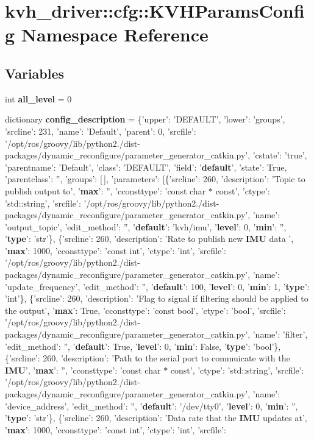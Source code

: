 \section{kvh\-\_\-driver\-:\-:cfg\-:\-:\-K\-V\-H\-Params\-Config \-Namespace \-Reference}
\label{namespacekvh__driver_1_1cfg_1_1KVHParamsConfig}
\subsection*{\-Variables}
\begin{DoxyCompactItemize}
\item 
int {\bf all\-\_\-level} = 0
\item 
dictionary {\bf config\-\_\-description} = \{'upper'\-: '\-D\-E\-F\-A\-U\-L\-T', 'lower'\-: 'groups', 'srcline'\-: 231, 'name'\-: '\-Default', 'parent'\-: 0, 'srcfile'\-: '/opt/ros/groovy/lib/python2./dist-\/packages/dynamic\-\_\-reconfigure/parameter\-\_\-generator\-\_\-catkin.\-py', 'cstate'\-: 'true', 'parentname'\-: '\-Default', 'class'\-: '\-D\-E\-F\-A\-U\-L\-T', 'field'\-: '{\bf default}', 'state'\-: \-True, 'parentclass'\-: '', 'groups'\-: [$\,$], 'parameters'\-: [\{'srcline'\-: 260, 'description'\-: '\-Topic to publish output to', '{\bf max}'\-: '', 'cconsttype'\-: 'const char $\ast$ const', 'ctype'\-: 'std\-::string', 'srcfile'\-: '/opt/ros/groovy/lib/python2./dist-\/packages/dynamic\-\_\-reconfigure/parameter\-\_\-generator\-\_\-catkin.\-py', 'name'\-: 'output\-\_\-topic', 'edit\-\_\-method'\-: '', '{\bf default}'\-: 'kvh/imu', '{\bf level}'\-: 0, '{\bf min}'\-: '', '{\bf type}'\-: 'str'\}, \{'srcline'\-: 260, 'description'\-: '\-Rate to publish new {\bf \-I\-M\-U} data ', '{\bf max}'\-: 1000, 'cconsttype'\-: 'const int', 'ctype'\-: 'int', 'srcfile'\-: '/opt/ros/groovy/lib/python2./dist-\/packages/dynamic\-\_\-reconfigure/parameter\-\_\-generator\-\_\-catkin.\-py', 'name'\-: 'update\-\_\-frequency', 'edit\-\_\-method'\-: '', '{\bf default}'\-: 100, '{\bf level}'\-: 0, '{\bf min}'\-: 1, '{\bf type}'\-: 'int'\}, \{'srcline'\-: 260, 'description'\-: '\-Flag to signal if filtering should be applied to the output', '{\bf max}'\-: \-True, 'cconsttype'\-: 'const bool', 'ctype'\-: 'bool', 'srcfile'\-: '/opt/ros/groovy/lib/python2./dist-\/packages/dynamic\-\_\-reconfigure/parameter\-\_\-generator\-\_\-catkin.\-py', 'name'\-: 'filter', 'edit\-\_\-method'\-: '', '{\bf default}'\-: \-True, '{\bf level}'\-: 0, '{\bf min}'\-: \-False, '{\bf type}'\-: 'bool'\}, \{'srcline'\-: 260, 'description'\-: '\-Path to the serial port to commuicate with the {\bf \-I\-M\-U}', '{\bf max}'\-: '', 'cconsttype'\-: 'const char $\ast$ const', 'ctype'\-: 'std\-::string', 'srcfile'\-: '/opt/ros/groovy/lib/python2./dist-\/packages/dynamic\-\_\-reconfigure/parameter\-\_\-generator\-\_\-catkin.\-py', 'name'\-: 'device\-\_\-address', 'edit\-\_\-method'\-: '', '{\bf default}'\-: '/dev/tty0', '{\bf level}'\-: 0, '{\bf min}'\-: '', '{\bf type}'\-: 'str'\}, \{'srcline'\-: 260, 'description'\-: '\-Data rate that the {\bf \-I\-M\-U} updates at', '{\bf max}'\-: 1000, 'cconsttype'\-: 'const int', 'ctype'\-: 'int', 'srcfile'\-: 
\end{DoxyCompactItemize}

